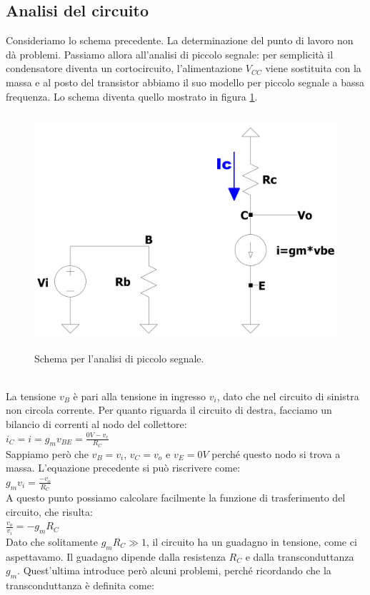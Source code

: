 \documentclass{report}
\begin{document}
\subsection{Analisi del circuito} 
Consideriamo lo schema precedente. La determinazione del punto di lavoro non dà problemi. Passiamo allora all'analisi di piccolo segnale: per semplicità il condensatore diventa un cortocircuito, l'alimentazione $V_{CC}$ viene sostituita con la massa e al posto del transistor abbiamo il suo modello per piccolo segnale a bassa frequenza. Lo schema diventa quello mostrato in figura \ref{figura:CEv1_ps}.
\begin{figure}[h]
\centering
\includegraphics[height=8.7cm]{immagini/CEv1_ps}
\caption{Schema per l'analisi di piccolo segnale.}
\label{figura:CEv1_ps}
\end{figure}
\\La tensione $v_B$ è pari alla tensione in ingresso $v_i$, dato che nel circuito di sinistra non circola corrente. Per quanto riguarda il circuito di destra, facciamo un bilancio di correnti al nodo del collettore:
\\[2pt]\indent $\displaystyle{i_C=i=g_m v_{BE}=\frac{0V-v_c}{R_C}}$
\\[2pt]Sappiamo però che $v_B=v_i$, $v_C=v_o$ e $v_E=0V$ perché questo nodo si trova a massa. L'equazione precedente si può riscrivere come:
\\[2pt]\indent $\displaystyle{g_m v_i=\frac{-v_o}{R_C}}$
\\[2pt]A questo punto possiamo calcolare facilmente la funzione di trasferimento del circuito, che risulta:
\\[2pt]\indent $\displaystyle{\frac{v_o}{v_i}=-g_m R_C}$
\\[2pt]Dato che solitamente $g_m R_C\gg 1$, il circuito ha un guadagno in tensione, come ci aspettavamo. Il guadagno dipende dalla resistenza $R_C$ e dalla transconduttanza $g_m$. Quest'ultima introduce però alcuni problemi, perché ricordando che la transconduttanza è definita come:
\end{document}
